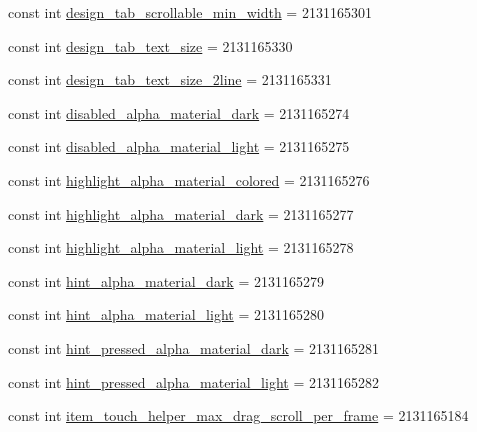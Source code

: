 \begin{CompactItemize}
\item 
const int \hyperlink{class__2doo_1_1_droid_1_1_resource_1_1_dimension_c6387356daf398a30dd39f238d56a3ab}{design\_\-tab\_\-scrollable\_\-min\_\-width} = 2131165301
\item 
const int \hyperlink{class__2doo_1_1_droid_1_1_resource_1_1_dimension_b6dadd739ac426aca200337e83f450b8}{design\_\-tab\_\-text\_\-size} = 2131165330
\item 
const int \hyperlink{class__2doo_1_1_droid_1_1_resource_1_1_dimension_7ad00ffd0205968da2c7d0975b04c7d3}{design\_\-tab\_\-text\_\-size\_\-2line} = 2131165331
\item 
const int \hyperlink{class__2doo_1_1_droid_1_1_resource_1_1_dimension_84fa25fb454d78e784734e9a2eb90cbe}{disabled\_\-alpha\_\-material\_\-dark} = 2131165274
\item 
const int \hyperlink{class__2doo_1_1_droid_1_1_resource_1_1_dimension_3c758dd47ce720641d1731fd141f21d7}{disabled\_\-alpha\_\-material\_\-light} = 2131165275
\item 
const int \hyperlink{class__2doo_1_1_droid_1_1_resource_1_1_dimension_6e41deaf6bef30b20e93c9dbe55949bb}{highlight\_\-alpha\_\-material\_\-colored} = 2131165276
\item 
const int \hyperlink{class__2doo_1_1_droid_1_1_resource_1_1_dimension_581a230a5c8a17e80c35f3c6dd0c21dc}{highlight\_\-alpha\_\-material\_\-dark} = 2131165277
\item 
const int \hyperlink{class__2doo_1_1_droid_1_1_resource_1_1_dimension_ceba58f2e7018ad38213597f9c214280}{highlight\_\-alpha\_\-material\_\-light} = 2131165278
\item 
const int \hyperlink{class__2doo_1_1_droid_1_1_resource_1_1_dimension_cfc249242f362c15431f775e37767a84}{hint\_\-alpha\_\-material\_\-dark} = 2131165279
\item 
const int \hyperlink{class__2doo_1_1_droid_1_1_resource_1_1_dimension_d73488950279f2066ca422b0eb1b3a9d}{hint\_\-alpha\_\-material\_\-light} = 2131165280
\item 
const int \hyperlink{class__2doo_1_1_droid_1_1_resource_1_1_dimension_ee8b1281242e0d08da92c68bea3830a2}{hint\_\-pressed\_\-alpha\_\-material\_\-dark} = 2131165281
\item 
const int \hyperlink{class__2doo_1_1_droid_1_1_resource_1_1_dimension_3e07132b47c9698ab36afc2edde1628c}{hint\_\-pressed\_\-alpha\_\-material\_\-light} = 2131165282
\item 
const int \hyperlink{class__2doo_1_1_droid_1_1_resource_1_1_dimension_cb0e5cbc7905e2e3934c3c96060e7c7d}{item\_\-touch\_\-helper\_\-max\_\-drag\_\-scroll\_\-per\_\-frame} = 2131165184

\end{CompactItemize}
